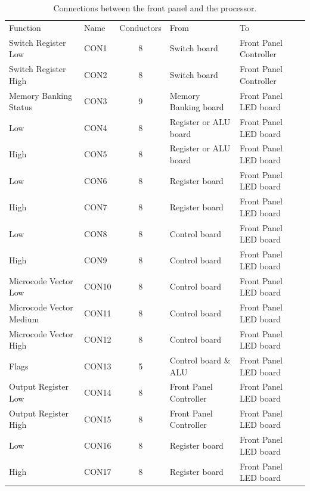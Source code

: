 \begin{table}[tb]
  \caption{\label{tab-connectors}Connections between the front panel
    and the processor.}
  \footnotesize
  \centering
  \zebra
  \begin{tabular}{llcll}
    \noalign{\smallskip}\hline\noalign{\smallskip}
    Function & Name & Conductors & From & To \\
    \noalign{\smallskip}\hline\noalign{\smallskip}
    Switch Register Low      & CON1  & 8 & Switch board & Front Panel Controller \\
    Switch Register High     & CON2  & 8 & Switch board & Front Panel Controller \\
    Memory Banking Status    & CON3  & 9 & Memory Banking board & Front Panel LED board \\
    \A{} Low                 & CON4  & 8 & Register or ALU board & Front Panel LED board \\
    \A{} High                & CON5  & 8 & Register or ALU board & Front Panel LED board \\
    \PC{} Low                & CON6  & 8 & Register board & Front Panel LED board \\
    \PC{} High               & CON7  & 8 & Register board & Front Panel LED board \\
    \IR{} Low                & CON8  & 8 & Control board & Front Panel LED board \\
    \IR{} High               & CON9  & 8 & Control board & Front Panel LED board \\
    Microcode Vector Low     & CON10 & 8 & Control board & Front Panel LED board \\
    Microcode Vector Medium  & CON11 & 8 & Control board & Front Panel LED board \\
    Microcode Vector High    & CON12 & 8 & Control board & Front Panel LED board \\
    Flags                    & CON13 & 5 & Control board \& ALU & Front Panel LED board \\
    Output Register Low      & CON14 & 8 & Front Panel Controller & Front Panel LED board \\
    Output Register High     & CON15 & 8 & Front Panel Controller & Front Panel LED board \\
    \DR{} Low                & CON16 & 8 & Register board & Front Panel LED board \\
    \DR{} High               & CON17 & 8 & Register board & Front Panel LED board \\

\end{tabular}
\end{table}
